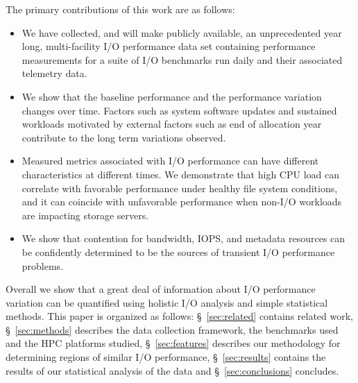 

The primary contributions of this work are as follows: 
\begin{itemize}[leftmargin=*]
\item We have collected, and will make publicly available, an unprecedented year long, multi-facility
I/O performance data set containing performance measurements for a suite of I/O benchmarks run daily and their associated telemetry data.
\item We show that the baseline performance and the performance variation changes over time.
Factors such as system software updates and sustained workloads motivated by external factors such as end of allocation year contribute to the long term variations observed. 
% 
% 
\item Measured metrics associated with I/O performance can have different characteristics at different times. We demonstrate that high CPU load can correlate with favorable performance under healthy file system conditions, and it can coincide with unfavorable performance when non-I/O workloads are impacting storage servers.
\item We show that contention for bandwidth, IOPS, and metadata resources can be confidently determined to be the sources of transient I/O performance problems.
\end{itemize}
Overall we show that a great deal of information about I/O performance variation can be quantified using holistic I/O analysis and simple statistical methods.
This paper is organized as follows: \S~\ref{sec:related} contains related work, \S~\ref{sec:methods} describes the data collection framework, the benchmarks used and the HPC platforms studied, \S~\ref{sec:features} describes our methodology for determining regions of similar I/O performance, \S~\ref{sec:results} contains the results of our statistical analysis of the data and \S~\ref{sec:conclusions} concludes. 

